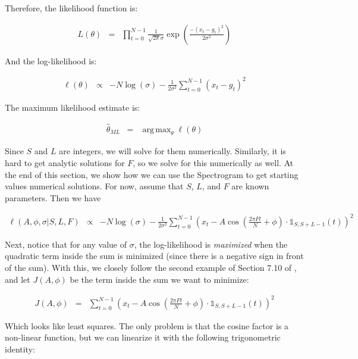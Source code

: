 \documentclass[11pt]{article}
\theoremstyle{plain}
\theoremstyle{definition}
\DeclareMathOperator*{\argmax}{arg\,max}
\begin{document}
\noindent Therefore, the likelihood function is:

\begin{eqnarray}
\label{eq:likelihood}
	L(\theta) &=& \prod_{t=0}^{N-1} \frac{1}{\sqrt{2 \pi} \sigma} \exp(\frac{-(x_t - g_t)^2}{2 \sigma^2})
\end{eqnarray}

\noindent And the log-likelihood is:

\begin{eqnarray}
\label{eq:loglikelihood}
	\ell(\theta) &\propto& -N \log(\sigma) - \frac{1}{2 \sigma^2} \sum_{t=0}^{N-1} (x_t - g_t)^2
\end{eqnarray}

\noindent The maximum likelihood estimate is:

\begin{eqnarray}
	\hat{\theta}_{ML} &=& \argmax_{\theta} \ell(\theta)
\end{eqnarray}

Since $S$ and $L$ are integers, we will solve for them numerically. Similarly, it is hard to get analytic solutions for $F$, so we solve for this numerically as well. At the end of this section, we show how we can use the Spectrogram to get starting values numerical solutions. For now, assume that $S$, $L$, and $F$ are known parameters. Then we have

\begin{eqnarray}
	\ell(A, \phi, \sigma | S, L, F) &\propto& -N \log(\sigma) - \frac{1}{2 \sigma^2} \sum_{t=0}^{N-1} (x_t - A \cos(\frac{2 \pi F t}{N} + \phi) \cdot \mathbb{1}_{S, S+L-1}(t))^2
\end{eqnarray}

Next, notice that for any value of $\sigma$, the log-likelihood is {\it maximized} when the quadratic term inside the sum is minimized (since there is a negative sign in front of the sum). With this, we closely follow the second example of Section 7.10 of \cite{kay1993fundamentals}, and let $J(A, \phi)$ be the term inside the sum we want to minimize:

\begin{eqnarray}
	J(A, \phi) &=& \sum_{t=0}^{N-1} (x_{t} - A \cos(\frac{2 \pi F t}{N} + \phi) \cdot \mathbb{1}_{S, S+L-1}(t))^2
\end{eqnarray}

\noindent Which looks like least squares. The only problem is that the cosine factor is a non-linear function, but we can linearize it with the following trigonometric identity:
\end{document}
